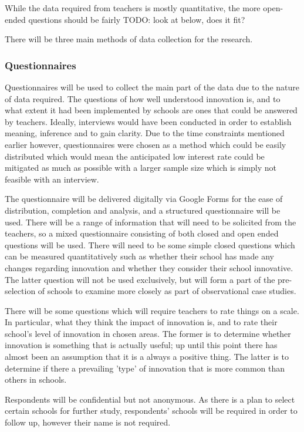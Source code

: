 While the data required from teachers is mostly quantitative, the more open-ended questions should be fairly 
TODO: look at below, does it fit?

There will be three main methods of data collection for the research.

\subsubsection{Questionnaires}
Questionnaires will be used to collect the main part of the data due to the nature of data required. The questions of how well understood innovation is, and to what extent it had been implemented by schools are ones that could be answered by teachers. Ideally, interviews would have been conducted in order to establish meaning, inference and to gain clarity. Due to the time constraints mentioned earlier however, questionnaires were chosen as a method which could be easily distributed which would mean the anticipated low interest rate could be mitigated as much as possible with a larger sample size which is simply not feasible with an interview.

The questionnaire will be delivered digitally via Google Forms for the ease of distribution, completion and analysis, and a structured questionnaire will be used. There will be a range of information that will need to be solicited from the teachers, so a mixed questionnaire consisting of both closed and open ended questions will be used. There will need to be some simple closed questions which can be measured quantitatively such as whether their school has made any changes regarding innovation and whether they consider their school innovative. The latter question will not be used exclusively, but will form a part of the pre-selection of schools to examine more closely as part of observational case studies.

There will be some questions which will require teachers to rate things on a scale. In particular, what they think the impact of innovation is, and to rate their school's level of innovation in chosen areas. The former is to determine whether innovation is something that is actually useful; up until this point there has almost been an assumption that it is a always a positive thing. The latter is to determine if there a prevailing 'type' of innovation that is more common than others in schools.

Respondents will be confidential but not anonymous. As there is a plan to select certain schools for further study, respondents' schools will be required in order to follow up, however their name is not required. 

